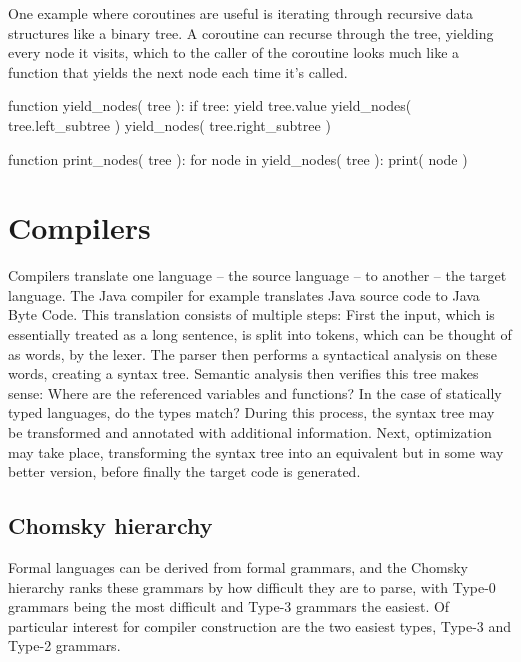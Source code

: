 		One example where coroutines are useful is iterating through recursive data structures like a binary tree. A coroutine can recurse through the tree, yielding every node it visits, which to the caller of the coroutine looks much like a function that yields the next node each time it's called.
		
		\begin{codelisting}[caption={Pseudocode of tree iteration using coroutines},morekeywords={function,if,for,in}]
function yield_nodes( tree ):
    if tree:
        yield tree.value
        yield_nodes( tree.left_subtree )
        yield_nodes( tree.right_subtree )

function print_nodes( tree ):
    for node in yield_nodes( tree ):
        print( node )
		\end{codelisting}
	
	\section{Compilers}
	
	
		Compilers translate one language -- the source language -- to another -- the target language. The Java compiler for example translates Java source code to Java Byte Code. This translation consists of multiple steps: First the input, which is essentially treated as a long sentence, is split into tokens, which can be thought of as words, by the lexer. The parser then performs a syntactical analysis on these words, creating a syntax tree. Semantic analysis then verifies this tree makes sense: Where are the referenced variables and functions? In the case of statically typed languages, do the types match? During this process, the syntax tree may be transformed and annotated with additional information. Next, optimization may take place, transforming the syntax tree into an equivalent but in some way better version, before finally the target code is generated.

		\subsection{Chomsky hierarchy}
			
			Formal languages can be derived from formal grammars, and the Chomsky hierarchy ranks these grammars by how difficult they are to parse, with Type-0 grammars being the most difficult and Type-3 grammars the easiest. Of particular interest for compiler construction are the two easiest types, Type-3 and Type-2 grammars.
			
